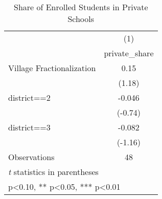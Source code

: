 \begin{table}[htbp]\centering
\def\sym#1{\ifmmode^{#1}\else\(^{#1}\)\fi}
\caption{Share of Enrolled Students in Private Schools \label{privateshare}}
\begin{tabular}{l*{1}{c}}
\toprule
                &\multicolumn{1}{c}{(1)}\\
                &\multicolumn{1}{c}{private\_share}\\
\midrule
Village Fractionalization&     0.15   \\
                &   (1.18)   \\
district==2     &   -0.046   \\
                &  (-0.74)   \\
district==3     &   -0.082   \\
                &  (-1.16)   \\
\midrule
Observations    &       48   \\
\bottomrule
\multicolumn{2}{l}{\footnotesize \textit{t} statistics in parentheses}\\
\multicolumn{2}{l}{\footnotesize * p<0.10, ** p<0.05, *** p<0.01}\\
\end{tabular}
\end{table}
